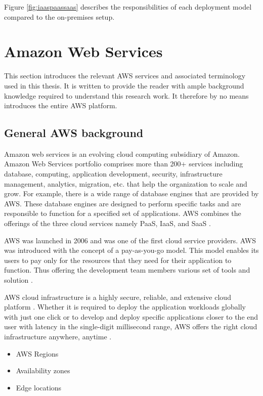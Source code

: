 \par Figure \ref{fig:iaaspaassaas} describes the responsibilities of each deployment model compared to the on-premises setup.

\section{Amazon Web Services}
\par This section introduces the relevant AWS services and associated terminology used in this thesis.
It is written to provide the reader with ample background knowledge required to understand this research work.
It therefore by no means introduces the entire AWS platform.

\subsection{General AWS background}

\par Amazon web services is an evolving cloud computing subsidiary of Amazon.
Amazon Web
Services portfolio comprises more than 200+ services
including database, computing, application
development, security, infrastructure management, analytics, migration, etc.
that help the
organization to scale and grow.
For example, there is a wide range of database engines that are provided by AWS. These database engines are designed to perform specific tasks and are responsible to function for a specified set of applications.
AWS combines the offerings of the three cloud services 
namely PaaS, IaaS, and SaaS \cite{17}.

\par AWS was launched in 2006 and was one of the first cloud service providers.
AWS was introduced with the concept of a pay-as-you-go model.
This model enables its users to pay only for the resources that they need for their application to function.
Thus offering the development team members various set
of tools
and
solution \cite{18}.

\par AWS cloud infrastructure is a highly secure,
reliable, and extensive cloud platform \cite{19}.
Whether
it is required to deploy the application workloads
globally with just one click or to develop and deploy
specific applications closer to the end user with latency in the single-digit millisecond range, AWS offers the right cloud infrastructure anywhere, anytime \cite{20}.

\begin{itemize}
    \item AWS Regions
    \item Availability zones
    \item Edge locations
\end{itemize}

